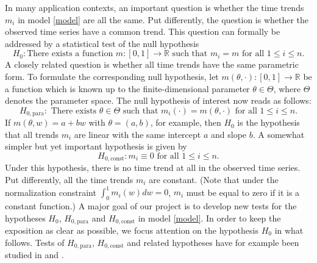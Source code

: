  
\noindent In many application contexts, an important question is whether the time trends $m_i$ in model \eqref{model} are all the same. Put differently, the question is whether the observed time series
have a common trend. This question can formally be addressed by a statistical test of the null hypothesis 
\[ H_0: \text{There exists a function } m: [0,1] \rightarrow \mathbb{R} \text{ such that } m_i = m  \text{ for all } 1 \le i \le n. \]
A closely related question is whether all time trends have the same parametric form. To formulate the corresponding null hypothesis, let $m(\theta,\cdot): [0,1] \rightarrow \mathbb{R}$ be a function which is known up to the finite-dimensional parameter $\theta \in \Theta$, where $\Theta$ denotes the parameter space. The null hypothesis of interest now reads as follows:  
\[ H_{0,\text{para}}: \text{ There exists } \theta \in \Theta \text{ such that } m_i(\cdot) = m(\theta,\cdot) \text{ for all } 1 \le i \le n. \]  
If $m(\theta,w) = a + b w$ with $\theta = (a,b)$, for example, then $H_0$ is the hypothesis that all trends $m_i$ are linear with the same intercept $a$ and slope $b$. A somewhat simpler but yet important hypothesis is given by 
\[ H_{0,\text{const}}: m_i \equiv 0 \text{ for all } 1 \le i \le n. \]
Under this hypothesis, there is no time trend at all in the observed time series. Put differently, all the time trends $m_i$ are constant. (Note that under the normalization constraint $\int_0^1 m_i(w) dw = 0$, $m_i$ must be equal to zero if it is a constant function.) A major goal of our project is to develop new tests for the hypotheses $H_0$, $H_{0,\text{para}}$ and $H_{0,\text{const}}$ in model \eqref{model}. In order to keep the exposition as clear as possible, we focus attention on the hypothesis $H_0$ in what follows. Tests of $H_{0,\text{para}}$, $H_{0,\text{const}}$ and related hypotheses have for example been studied in \cite{Lyubchich2016} and \cite{ChenWu2018}. 


